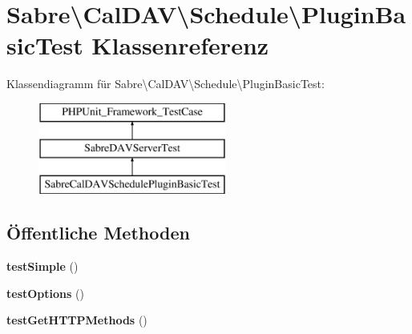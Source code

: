 \hypertarget{class_sabre_1_1_cal_d_a_v_1_1_schedule_1_1_plugin_basic_test}{}\section{Sabre\textbackslash{}Cal\+D\+AV\textbackslash{}Schedule\textbackslash{}Plugin\+Basic\+Test Klassenreferenz}
\label{class_sabre_1_1_cal_d_a_v_1_1_schedule_1_1_plugin_basic_test}
Klassendiagramm für Sabre\textbackslash{}Cal\+D\+AV\textbackslash{}Schedule\textbackslash{}Plugin\+Basic\+Test\+:\begin{figure}[H]
\begin{center}
\leavevmode
\includegraphics[height=3.000000cm]{class_sabre_1_1_cal_d_a_v_1_1_schedule_1_1_plugin_basic_test}
\end{center}
\end{figure}
\subsection*{Öffentliche Methoden}
\begin{DoxyCompactItemize}
\item 
\mbox{\label{class_sabre_1_1_cal_d_a_v_1_1_schedule_1_1_plugin_basic_test_af17d5784727782e81ced8e247bdafea5}} 
{\bfseries test\+Simple} ()
\item 
\mbox{\label{class_sabre_1_1_cal_d_a_v_1_1_schedule_1_1_plugin_basic_test_ac39e1d897f02b38047176d804e3e3008}} 
{\bfseries test\+Options} ()
\item 
\mbox{\label{class_sabre_1_1_cal_d_a_v_1_1_schedule_1_1_plugin_basic_test_aad8b8e4aeffbb39265c44ea44f27e51c}} 
{\bfseries test\+Get\+H\+T\+T\+P\+Methods} ()
\end{DoxyCompactItemize}
